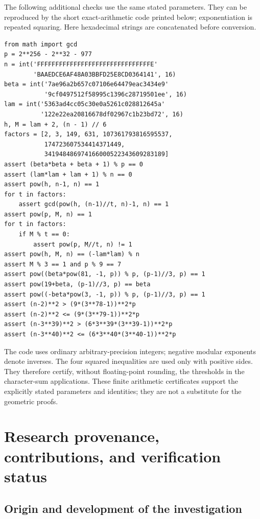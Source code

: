\documentclass[
  11pt,
  a4paper,
]{article}
\begin{document}
The following additional checks use the same stated parameters. They can
be reproduced by the short exact-arithmetic code printed below;
exponentiation is repeated squaring. Here hexadecimal strings are
concatenated before conversion.

\begin{verbatim}
from math import gcd
p = 2**256 - 2**32 - 977
n = int('FFFFFFFFFFFFFFFFFFFFFFFFFFFFFFFE'
        'BAAEDCE6AF48A03BBFD25E8CD0364141', 16)
beta = int('7ae96a2b657c07106e64479eac3434e9'
           '9cf0497512f58995c1396c28719501ee', 16)
lam = int('5363ad4cc05c30e0a5261c028812645a'
          '122e22ea20816678df02967c1b23bd72', 16)
h, M = lam + 2, (n - 1) // 6
factors = [2, 3, 149, 631, 107361793816595537,
           174723607534414371449,
           341948486974166000522343609283189]
assert (beta*beta + beta + 1) % p == 0
assert (lam*lam + lam + 1) % n == 0
assert pow(h, n-1, n) == 1
for t in factors:
    assert gcd(pow(h, (n-1)//t, n)-1, n) == 1
assert pow(p, M, n) == 1
for t in factors:
    if M % t == 0:
        assert pow(p, M//t, n) != 1
assert pow(h, M, n) == (-lam*lam) % n
assert M % 3 == 1 and p % 9 == 7
assert pow((beta*pow(81, -1, p)) % p, (p-1)//3, p) == 1
assert pow(19+beta, (p-1)//3, p) == beta
assert pow((-beta*pow(3, -1, p)) % p, (p-1)//3, p) == 1
assert (n-2)**2 > (9*(3**78-1))**2*p
assert (n-2)**2 <= (9*(3**79-1))**2*p
assert (n-3**39)**2 > (6*3**39*(3**39-1))**2*p
assert (n-3**40)**2 <= (6*3**40*(3**40-1))**2*p
\end{verbatim}

The code uses ordinary arbitrary-precision integers; negative modular
exponents denote inverses. The four squared inequalities are used only
with positive sides. They therefore certify, without floating-point
rounding, the thresholds in the character-sum applications. These finite
arithmetic certificates support the explicitly stated parameters and
identities; they are not a substitute for the geometric proofs.

\section{Research provenance, contributions, and verification
status}\label{research-provenance-contributions-and-verification-status}

\subsection{Origin and development of the
investigation}\label{origin-and-development-of-the-investigation}
\end{document}
